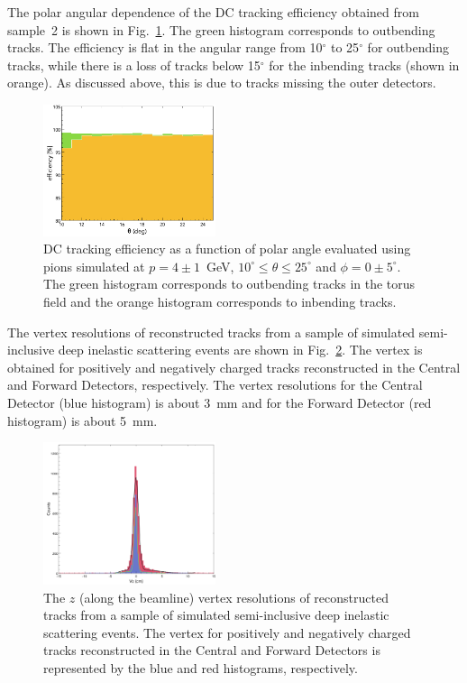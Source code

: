 The polar angular dependence of the DC tracking efficiency obtained from sample~2 is shown in
Fig.~\ref{fig:trkeffinoutb}. The green histogram corresponds to outbending tracks. The efficiency is flat
in the angular range from 10$^\circ$ to 25$^\circ$ for outbending tracks, while there is a loss of tracks below
15$^\circ$ for the inbending tracks (shown in orange). As discussed above, this is due to tracks missing the outer
detectors.
\begin{figure}[t]
\includegraphics[width=0.45\textwidth]{pics/DCTrkEffvsThetaInandOutbenders.png}
\caption{DC tracking efficiency as a function of polar angle evaluated using pions simulated at $p=4\pm 1$~GeV,
  $10^\circ \leq \theta \leq 25^\circ$ and $\phi = 0 \pm 5^\circ$. The green histogram corresponds to outbending
  tracks in the torus field and the orange histogram corresponds to inbending tracks.}
\label{fig:trkeffinoutb}
\end{figure}

The vertex resolutions of reconstructed tracks from a sample of simulated semi-inclusive deep inelastic scattering
events are shown in Fig.~\ref{fig:vtxres}. The vertex is obtained for positively and negatively charged tracks reconstructed
in the Central and Forward Detectors, respectively. The vertex resolutions for the Central Detector (blue histogram)
is about 3~mm and for the Forward Detector (red histogram) is about 5~mm. 
\begin{figure}[ht]
\includegraphics[width=0.45\textwidth]{pics/VertexResolution.png}
\caption{The $z$ (along the beamline) vertex resolutions of reconstructed tracks from a sample of simulated
  semi-inclusive deep inelastic scattering events. The vertex for positively and negatively charged tracks reconstructed
  in the Central and Forward Detectors is represented by the blue and red histograms, respectively.}
\label{fig:vtxres}
\end{figure}

